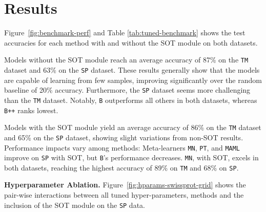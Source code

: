 \section{Results}


Figure~\ref{fig:benchmark-perf} and Table \ref{tab:tuned-benchmark} shows the test accuracies for each method with and without the SOT module on both datasets.

Models without the SOT module reach an average accuracy of 87\% on the \texttt{TM} dataset and 63\% on the \texttt{SP} dataset. These results generally show that the models are capable of learning from few samples, improving significantly over the random baseline of 20\% accuracy. Furthermore, the \texttt{SP} dataset seems more challenging than the \texttt{TM} dataset. Notably, \texttt{B} outperforms all others in both datasets, whereas \texttt{B++} ranks lowest.

Models with the SOT module yield an average accuracy of 86\% on the \texttt{TM} dataset and 65\% on the \texttt{SP} dataset, showing slight variations from non-SOT results. Performance impacts vary among methods: Meta-learners \texttt{MN}, \texttt{PT}, and \texttt{MAML} improve on \texttt{SP} with SOT, but \texttt{B}'s performance decreases. \texttt{MN}, with SOT, excels in both datasets, reaching the highest accuracy of 89\% on \texttt{TM} and 68\% on \texttt{SP}.

\textbf{Hyperparameter Ablation.} Figure~\ref{fig:hparams-swissprot-grid} shows the pair-wise interactions between all tuned hyper-parameters, methods and the inclusion of the SOT module on the \texttt{SP} data.


